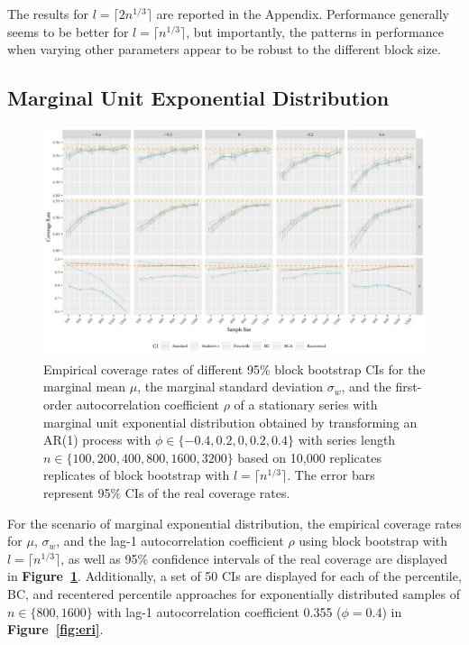 \documentclass[10pt]{article}
\begin{document}
The results for $l = \lceil 2n^{1/3} \rceil$ are reported in the Appendix.
Performance generally seems to be better for $l = \lceil n^{1/3} \rceil$, but
importantly, the patterns in performance when varying other parameters
appear to be robust to the different block size.


\subsection*{Marginal Unit Exponential Distribution}

\begin{figure}[tbp]
  \centering
  \includegraphics[width=\textwidth]{figures/alt_plot_exp1}
  \caption{Empirical coverage rates of different 95\% block bootstrap CIs for
    the marginal mean $\mu$, the marginal standard deviation $\sigma_w$, and
    the first-order autocorrelation coefficient $\rho$ of a stationary series 
    with 
    marginal unit exponential distribution obtained by transforming an AR(1) 
    process
    with $\phi \in \{-0.4, 0.2, 0, 0.2, 0.4\}$ with series length 
    $n \in \{100, 200, 400, 800, 1600, 3200\}$ based on 10,000 replicates 
    replicates of
    block bootstrap with $l = \lceil n^{1/3} \rceil$. 
    The error bars represent 95\% CIs of the real coverage rates.}
  \label{fig:exp1}
\end{figure}


For the scenario of marginal exponential distribution, the empirical
coverage rates for $\mu$, $\sigma_w$, and 
the lag-1 autocorrelation coefficient $\rho$ using block bootstrap
with $l = \lceil n^{1/3} \rceil$, as well as 95\%
confidence intervals of the real coverage are displayed in 
\textbf{Figure~\ref{fig:exp1}}. 
Additionally, a set of 50 CIs are displayed for each of the percentile, 
BC, and recentered percentile approaches for exponentially distributed
samples of $n \in \{800, 1600\}$ with lag-1 autocorrelation coefficient 0.355
($\phi = 0.4$) in \textbf{Figure~\ref{fig:eri}}.
\end{document}
